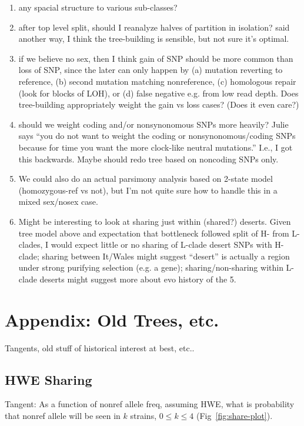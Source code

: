 \documentclass{article}\usepackage[]{graphicx}\usepackage[]{color}
\begin{document}
\begin{enumerate}
  \item any spacial structure to various sub-classes?
  \item after top level split, should I reanalyze halves of partition in isolation?  said another way, I think the
    tree-building is sensible, but not sure it's optimal.
  \item if we believe no sex, then I think gain of SNP should be more common than loss of SNP, since the later can only
    happen by (a) mutation reverting to reference, (b) second mutation matching nonreference, (c) homologous repair
    (look for blocks of LOH), or (d) false negative e.g. from low read depth.  Does tree-building appropriately weight
    the gain vs loss cases?  (Does it even care?)
  \item should we weight coding and/or nonsynonomous SNPs more heavily?  Julie says ``you do not want to weight the
    coding or nonsynonomous/coding SNPs because for time you want the more clock-like neutral mutations.''  I.e., I got
    this backwards.  Maybe should redo tree based on noncoding SNPs only.
  \item We could also do an actual parsimony analysis based on 2-state model (homozygous-ref vs not), but I'm not 
    quite sure how to handle this in a mixed sex/nosex case.
  \item Might be interesting to look at sharing just within (shared?) deserts.  Given tree model above and expectation
    that bottleneck followed split of H- from L-clades, I would expect little or no sharing of L-clade desert SNPs
    with H-clade; sharing between It/Wales might suggest ``desert'' is actually a region under strong purifying selection
    (e.g. a gene); sharing/non-sharing within L-clade deserts might suggest more about evo history of the 5.
\end{enumerate}


\section{Appendix: Old Trees, etc.}
Tangents, old stuff of historical interest at best, etc..

\subsection{HWE Sharing}
Tangent: As a function of nonref allele freq, assuming HWE, what is probability that nonref allele will be seen in $k$ strains, $0 \leq k \leq 4$ (Fig~\ref{fig:share-plot}).
\end{document}
